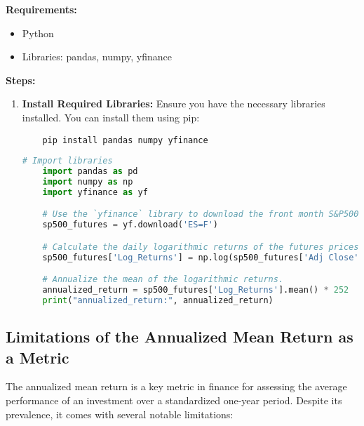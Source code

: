 \documentclass{article}
\begin{document}
\textbf{Requirements:}
\begin{itemize}
    \item Python
    \item Libraries: pandas, numpy, yfinance
\end{itemize}

\textbf{Steps:}

\begin{enumerate}
    \item \textbf{Install Required Libraries:} Ensure you have the necessary libraries installed. You can install them using pip:
    \begin{verbatim}
    pip install pandas numpy yfinance
    \end{verbatim}

    \begin{lstlisting}[language=Python]
    # Import libraries
    import pandas as pd
    import numpy as np
    import yfinance as yf

    # Use the `yfinance` library to download the front month S&P500 futures price data.
    sp500_futures = yf.download('ES=F')

    # Calculate the daily logarithmic returns of the futures prices.
    sp500_futures['Log_Returns'] = np.log(sp500_futures['Adj Close'] / sp500_futures['Adj Close'].shift(1))

    # Annualize the mean of the logarithmic returns.
    annualized_return = sp500_futures['Log_Returns'].mean() * 252
    print("annualized_return:", annualized_return) 
    \end{lstlisting}
\end{enumerate}

\subsection{Limitations of the Annualized Mean Return as a Metric}

The annualized mean return is a key metric in finance for assessing the average performance of an investment over a standardized one-year period. Despite its prevalence, it comes with several notable limitations:
\end{document}
